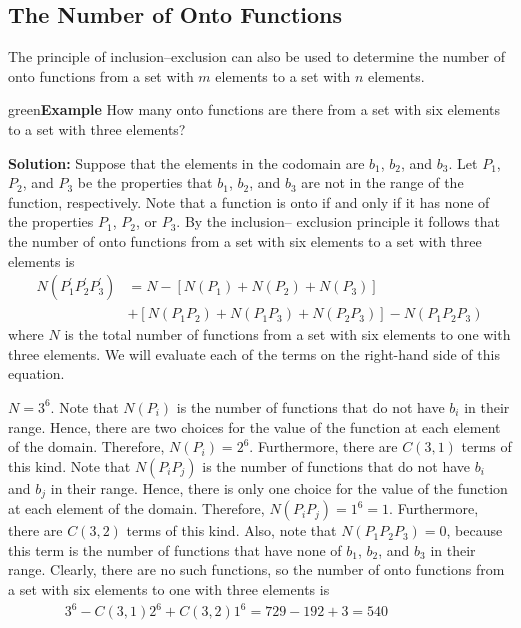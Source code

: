 \documentclass[11pt]{article}
\newenvironment{example}[1][\unskip]{\begin{mybox}{green}{\textbf{Example} {#1}}}{\end{mybox}}
\begin{document}
\subsection{The Number of Onto Functions}

The principle of inclusion–exclusion can also be used to determine the number of onto functions from a set with $m$ elements to a set with $n$ elements.

\begin{example}
How many onto functions are there from a set with six elements to a set with three elements?

\textbf{Solution:}
Suppose that the elements in the codomain are $b_1$, $b_2$, and $b_3$. Let $P_1$, $P_2$, and $P_3$ be the properties that $b_1$, $b_2$, and $b_3$ are not in the range of the function, respectively. Note that a function is onto if and only if it has none of the properties $P_1$, $P_2$, or $P_3$. By the inclusion– exclusion principle it follows that the number of onto functions from a set with six elements to a set with three elements is 
\begin{align*}
    N(P_1^{'} P_2^{'} P_3^{'}) &= N - [N(P_1) + N(P_2) + N(P_3)]\\
    &+ [N(P_1P_2) + N(P_1P_3) + N(P_2P_3)] - N(P_1P_2P_3)
\end{align*}
where $N$ is the total number of functions from a set with six elements to one with three elements. We will evaluate each of the terms on the right-hand side of this equation.

$N = 3^6$. Note that $N(P_i)$ is the number of functions that do not have $b_i$ in their range. Hence, there are two choices for the value of the function at each element of the domain. Therefore, $N(P_i) = 2^6$. Furthermore, there are $C(3, 1)$ terms of this kind. Note that $N(P_iP_j)$ is the number of functions that do not have $b_i$ and $b_j$ in their range. Hence, there is only one choice for the value of the function at each element of the domain. Therefore, $N(P_iP_j) = 1^6 = 1$. Furthermore, there are $C(3, 2)$ terms of this kind. Also, note that $N(P_1P_2P_3) = 0$, because this term is the number of functions that have none of $b_1$, $b_2$, and $b_3$ in their range. Clearly, there are no such functions, so the number of onto functions from a set with six elements to one with three elements is 
\begin{align*}
    3^6 - C(3, 1) 2^6 + C(3, 2) 1^6 = 729 - 192 + 3 = 540&&&&&&
\end{align*}
\end{example}
\end{document}
